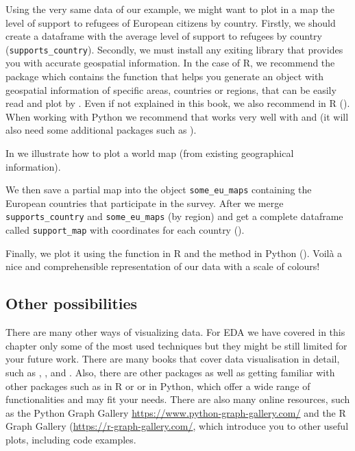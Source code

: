 Using the very same data of our example, we might want to plot in a map the level of support to refugees of European citizens by country. Firstly, we should create a dataframe with the average level of support to refugees by country (\texttt{supports\_country}). Secondly, we must install any exiting library that provides you with accurate geospatial information. In the case of R, we recommend the package  which contains the function  that helps you generate an object with geospatial information of specific areas, countries or regions, that can be easily read and plot by . Even if not explained in this book, we also recommend  in R (\cite{kahle2013ggmap}). When working with Python we recommend  that works very well with  and  (it will also need some additional packages such as ).  

In  we illustrate how to plot a world map (from existing geographical information).


We then save a partial map into the object \texttt{some\_eu\_maps} containing the European countries that participate in the survey. After we merge \texttt{supports\_country} and \texttt{some\_eu\_maps} (by region) and get a complete dataframe called \texttt{support\_map} with coordinates for each country ().  


Finally, we plot it using the  function  in R and the  method  in Python (). Voilà a nice and comprehensible representation of our data with a scale of colours!



\subsection{Other possibilities}

There are many other ways of visualizing data. For EDA we have covered in this chapter only some of the most used techniques but they might be still limited for your future work. There are many books that cover data visualisation in detail, such as \cite{tufte2006beautiful}, \cite{cairo2019charts}, and \cite{Kirk2016}. Also, there are other packages as well as getting familiar with other packages such as  in R or  or  in Python, which offer a wide range of functionalities and may fit your needs. There are also many online resources, such as the Python Graph Gallery \url{https://www.python-graph-gallery.com/} and the R Graph Gallery (\url{https://r-graph-gallery.com/}, which introduce you to other useful plots, including code examples.
